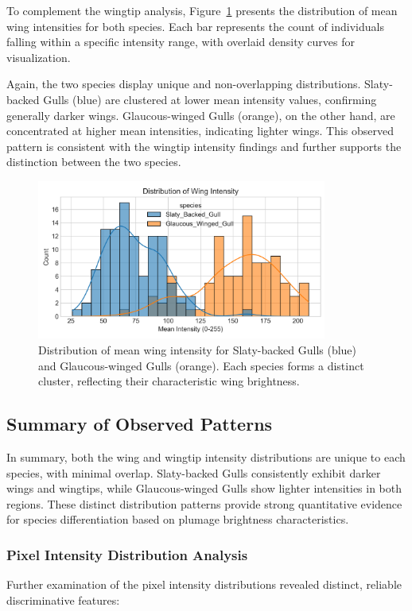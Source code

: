 \documentclass[a4paper,12pt]{report}
\begin{document}
To complement the wingtip analysis, Figure~\ref{fig:wing_intensity_distribution} presents the distribution of mean wing intensities for both species. Each bar represents the count of individuals falling within a specific intensity range, with overlaid density curves for visualization.

Again, the two species display unique and non-overlapping distributions. Slaty-backed Gulls (blue) are clustered at lower mean intensity values, confirming generally darker wings. Glaucous-winged Gulls (orange), on the other hand, are concentrated at higher mean intensities, indicating lighter wings. This observed pattern is consistent with the wingtip intensity findings and further supports the distinction between the two species.

\begin{figure}[h]
\centering
\includegraphics[width=0.85\textwidth]{images/REPORT_IMAGES_INTENSITY/I2/ditribution.png}
\caption{Distribution of mean wing intensity for Slaty-backed Gulls (blue) and Glaucous-winged Gulls (orange). Each species forms a distinct cluster, reflecting their characteristic wing brightness.}
\label{fig:wing_intensity_distribution}
\end{figure}

\subsection{Summary of Observed Patterns}

In summary, both the wing and wingtip intensity distributions are unique to each species, with minimal overlap. Slaty-backed Gulls consistently exhibit darker wings and wingtips, while Glaucous-winged Gulls show lighter intensities in both regions. These distinct distribution patterns provide strong quantitative evidence for species differentiation based on plumage brightness characteristics.

\subsubsection{Pixel Intensity Distribution Analysis}
Further examination of the pixel intensity distributions revealed distinct, reliable discriminative features:
\end{document}
